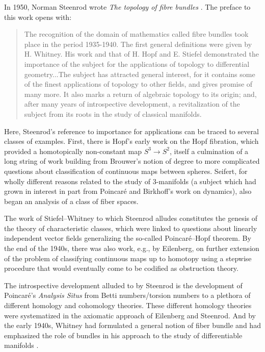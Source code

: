 \documentclass[11pt,leqno]{article}
\renewcommand{\1}{{\rm 1\hspace*{-0.4ex}%
\rule{0.1ex}{1.52ex}\hspace*{0.2ex}}}
\newcommand{\<}[1]{{\langle}#1 {\rangle}}
\newcounter{intro}
\theoremstyle{plain}
\theoremstyle{definition}
\theoremstyle{remark}
\numberwithin{equation}{subsection}
\begin{document}
In 1950, Norman Steenrod wrote {\em The topology of fibre bundles} \cite{SteenrodFB}.  The preface to this work opens with:
\begin{quote}
	The recognition of the domain of mathematics called fibre bundles took place in the period 1935-1940. The first general definitions were given by H. Whitney. His work and that of H. Hopf and E. Stiefel demonstrated the importance of the subject for the applications of topology to differential geometry...The subject has attracted general interest, for it contains some of the finest applications of topology to other fields, and gives promise of many more. It also marks a return of algebraic topology to its origin; and, after many years of introspective development, a revitalization of the subject 
	from its roots in the study of classical manifolds.  
\end{quote} 

Here, Steenrod's reference to importance for applications can be traced to several classes of examples.  First, there is Hopf's early work on the Hopf fibration, which provided a homotopically non-constant map $S^3 \to S^2$, itself a culmination of a long string of work building from Brouwer's notion of degree to more complicated questions about classification of continuous maps between spheres.  Seifert, for wholly different reasons related to the study of $3$-manifolds (a subject which had grown in interest in part from Poincar\'e and Birkhoff's work on dynamics), also began an analysis of a class of fiber spaces.

The work of Stiefel--Whitney to which Steenrod alludes constitutes the genesis of the theory of characteristic classes, which were linked to questions about linearly independent vector fields generalizing the so-called Poincar\'e--Hopf theorem.  By the end of the 1940s, there was also work, e.g., by Eilenberg, on further extension of the problem of classifying continuous maps up to homotopy using a stepwise procedure that would eventually come to be codified as obstruction theory.  

The introspective development alluded to by Steenrod is the development of Poincar\'e's {\em Analysis Situs} from Betti numbers/torsion numbers to a plethora of different homology and cohomology theories.  These different homology theories were systematized in the axiomatic approach of Eilenberg and Steenrod.  And by the early 1940s, Whitney had formulated a general notion of fiber bundle and had emphasized the role of bundles in his approach to the study of differentiable manifolds \cite{WhitneyFB}.  
\end{document}
